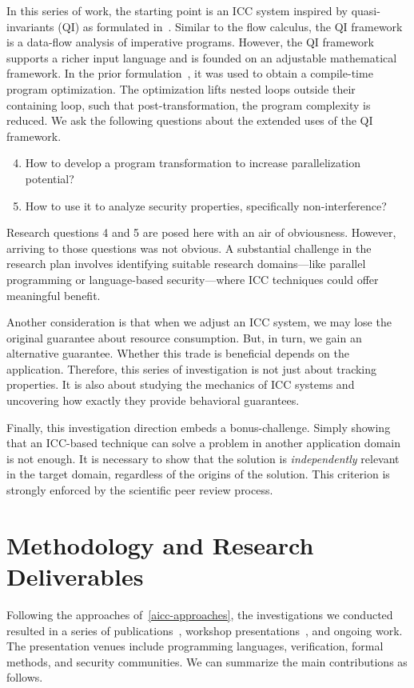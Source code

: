 In this series of work, the starting point is an ICC system inspired by quasi-invariants (QI) as formulated in~\cite{moyen20172}.
Similar to the flow calculus, the QI framework is a data-flow analysis of imperative programs.
However, the QI framework supports a richer input language and is founded on an adjustable mathematical framework.
In the prior formulation~\cite{moyen20172}, it was used to obtain a compile-time program optimization.
The optimization lifts nested loops outside their containing loop, such that post-transformation, the program complexity is reduced.
We ask the following questions about the extended uses of the QI framework.
\begin{enumerate}[label={(RQ\arabic*)}]
\setcounter{enumi}{3}
\item How to develop a program transformation to increase parallelization potential?
\item How to use it to analyze security properties, specifically non-interference?
\end{enumerate}
Research questions 4 and 5 are posed here with an air of obviousness.
However, arriving to those questions was not obvious.
A substantial challenge in the research plan involves identifying suitable research domains---like parallel programming or language-based security---where ICC techniques could offer meaningful benefit.

Another consideration is that when we adjust an ICC system, we may lose the original guarantee about resource consumption.
But, in turn, we gain an alternative guarantee.
Whether this trade is beneficial depends on the application.
Therefore, this series of investigation is not just about tracking properties.
It is also about studying the mechanics of ICC systems and uncovering how exactly they provide behavioral guarantees.

Finally, this investigation direction embeds a bonus-challenge.
Simply showing that an ICC-based technique can solve a problem in another application domain is not enough.
It is necessary to show that the solution is \emph{independently} relevant in the target domain, regardless of the origins of the solution.
This criterion is strongly enforced by the scientific peer review process.

\section{Methodology and Research Deliverables}
\label{aicc-methods}

Following the approaches of~\autoref{aicc-approaches},
the investigations we conducted resulted in a series of publications~\cite{aubert20222,aubert20232,aubert2023b},
workshop presentations~\cite{aubert20231,aubert202217,splash22}, and ongoing work.
The presentation venues include programming languages, verification, formal methods, and security communities.
We can summarize the main contributions as follows.

